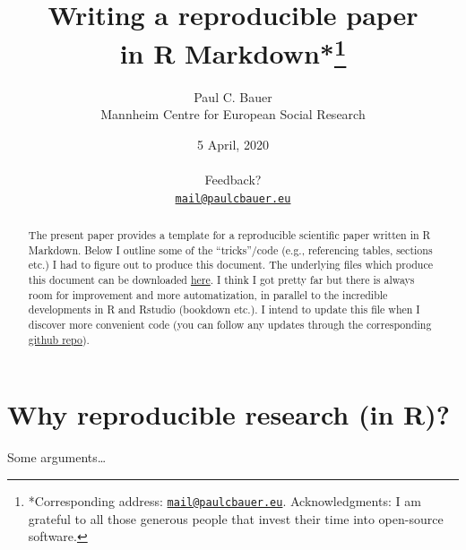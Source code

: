 \documentclass[
  12pt,
]{article}
\title{\vspace{1cm}Writing a reproducible paper\\
in R Markdown*\footnote{*Corresponding address: \href{mailto:mail@paulcbauer.eu}{\nolinkurl{mail@paulcbauer.eu}}. Acknowledgments: I am grateful to all those generous people that invest their time into open-source software.}\vspace{0.5cm}\\}
\author{Paul C. Bauer\\
Mannheim Centre for European Social Research}
\date{5 April, 2020\\
~\\
Feedback?\\
\href{mailto:mail@paulcbauer.eu}{\nolinkurl{mail@paulcbauer.eu}}\\}
\begin{document}
\maketitle
\begin{abstract}
\noindent{}The present paper provides a template for a reproducible scientific paper written in R Markdown. Below I outline some of the ``tricks''/code (e.g., referencing tables, sections etc.) I had to figure out to produce this document. The underlying files which produce this document can be downloaded \href{https://drive.google.com/drive/folders/1zJP3cNPrHN-gj0rcmbHQgg-XA0hqDXdd?usp=sharing}{here}. I think I got pretty far but there is always room for improvement and more automatization, in parallel to the incredible developments in R and Rstudio (bookdown etc.). I intend to update this file when I discover more convenient code (you can follow any updates through the corresponding \href{https://github.com/paulcbauer/Writing_a_reproducable_paper_in_rmarkdown/}{github repo}).\vspace{.8cm}
\end{abstract}

\clearpage

\renewcommand{\baselinestretch}{0.5}\normalsize
\tableofcontents
\renewcommand{\baselinestretch}{1.1}\normalsize

\clearpage

\hypertarget{why-reproducible-research-in-r}{%
\section{Why reproducible research (in R)?}\label{why-reproducible-research-in-r}}

Some arguments\ldots{}
\end{document}
